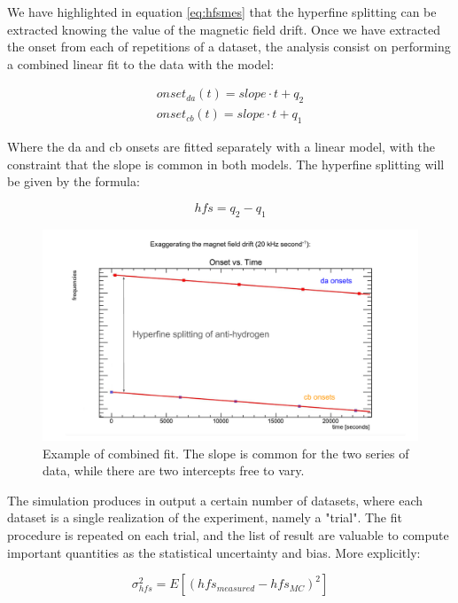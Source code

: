 \documentclass[11pt,a4paper,oneside]{article}
\begin{document}
We have highlighted in equation \ref{eq:hfsmes} that the hyperfine splitting can be extracted knowing the value of the magnetic field drift. Once we have extracted the onset from each of repetitions of a dataset, the analysis consist on performing a combined linear fit to the data with the model:

\begin{align}
onset_{da}(t) = slope \cdot t + q_{2} \\
onset_{cb}(t) = slope \cdot t + q_{1}
\end{align} 

Where the da and cb onsets are fitted separately with a linear model, with the constraint that the slope is common in both models. The hyperfine splitting will be given by the formula:

\begin{equation}
hfs = q_{2} - q_{1}
\end{equation}

\begin{figure}[hbtp]
\centering
\includegraphics[width = \textwidth]{Fit.pdf}
\caption{ Example of combined fit. The slope is common for the two series of data, while there are two intercepts free to vary.}
\end{figure}

The simulation produces in output a certain number of datasets, where each dataset is a single realization of the experiment, namely a "trial". The fit procedure is repeated on each trial, and the list of result are valuable to compute important quantities as the statistical uncertainty and bias. More explicitly:

\begin{equation}
\sigma_{hfs}^2 = E[(hfs_{measured} - hfs_{MC})^2]
\end{equation} 
\end{document}
